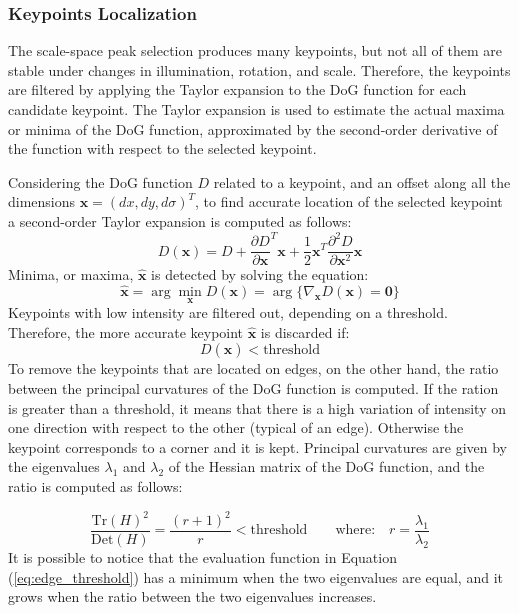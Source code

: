 \subsubsection*{Keypoints Localization}
The scale-space peak selection produces many keypoints, but not all of them are 
stable under changes in illumination, rotation, and scale. Therefore, the 
keypoints are filtered by applying the Taylor expansion to the DoG function 
for each candidate keypoint. The Taylor expansion is used to estimate 
the actual maxima or minima of the DoG function, approximated by the 
second-order derivative of the function with respect to the selected keypoint.

Considering the DoG function $D$ related to a keypoint, and an offset 
along all the dimensions
$\boldsymbol{x} = (dx, dy, d\sigma)^T$, 
to find accurate location of the selected keypoint a second-order Taylor expansion 
is computed as follows:
\begin{equation}
    D(\boldsymbol{x}) = D + \frac{\partial D}{\partial \boldsymbol{x}}^T \boldsymbol{x} + 
    \frac{1}{2} \boldsymbol{x}^T \frac{\partial^2 D}{\partial \boldsymbol{x}^2} \boldsymbol{x}
    \label{eq:taylor_expansion}
\end{equation}
Minima, or maxima, $\boldsymbol{\hat{x}}$ is detected by solving the equation:
\begin{equation}
    \boldsymbol{\hat{x}} = \arg \min_{\boldsymbol{x}} D(\boldsymbol{x})
    = \arg \{ \nabla_{\boldsymbol{x}} D(\boldsymbol{x}) = \boldsymbol{0} \}
\end{equation}
Keypoints with low intensity are filtered out, depending on a threshold. Therefore, 
the more accurate keypoint $\boldsymbol{\hat{x}}$ is discarded if:
\begin{equation}
    D(\boldsymbol{\hat{x}}) < \text{threshold}
\label{eq:contrast_threshold}
\end{equation}
To remove the keypoints that are located on edges, on the other hand, the ratio 
between the principal curvatures of the DoG function is computed. 
If the ration is greater than a threshold, it means that there is a high variation 
of intensity on one direction with respect to the other (typical of an edge). 
Otherwise the keypoint corresponds to a corner and it is kept.
Principal curvatures are given by the eigenvalues $\lambda_1$ and $\lambda_2$
of the Hessian matrix of the 
DoG function, and the ratio is computed as follows:

\begin{equation}
    \frac{\text{Tr}(H)^2}{\text{Det}(H)} = \frac{(r+1)^2}{r} < \text{threshold}
    \qquad
    \text{where:} \quad r = \frac{\lambda_1}{\lambda_2}
    \label{eq:edge_threshold}
\end{equation}
It is possible to notice that the evaluation function in Equation 
(\ref{eq:edge_threshold}) has a minimum when the two eigenvalues are equal, 
and it grows when the ratio between the two eigenvalues increases.

